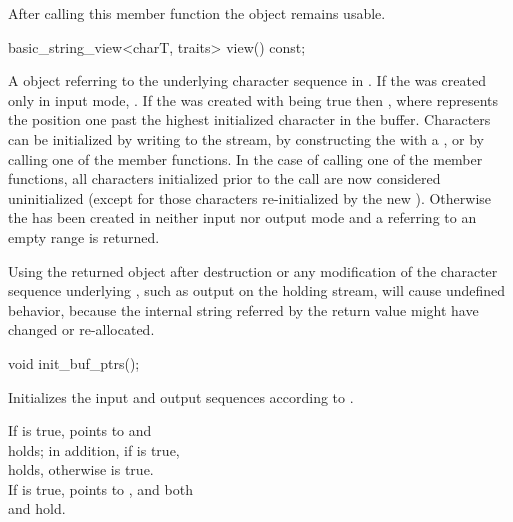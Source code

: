 \documentclass[ebook,11pt,article]{memoir}
\begin{document}
\begin{insrt}
\begin{itemdescr}
\pnum
\begin{note}
After calling this member function the  object remains usable.
\end{note}
\end{itemdescr}

\begin{itemdecl}
basic_string_view<charT, traits> view() const;
\end{itemdecl}
\begin{itemdescr}
\pnum
\returns A  object referring to the  underlying character sequence
in . 
If the  was created only in input mode,  
. 
If the  was created with  being true 
then , 
where  represents the position one past the highest initialized character in the buffer. 
Characters can be initialized by writing to the stream, 
by constructing the  with a , 
or by calling one of the  member functions. 
In the case of calling one of the  member functions, 
all characters initialized prior to the call are now considered uninitialized 
(except for those characters re-initialized by the new ). 
Otherwise the  has been created in neither input nor output mode 
and a  referring to an empty range is returned. 

\pnum
\begin{note}
Using the returned  object after destruction or any modification of the character sequence underlying , such as output on the holding stream, will cause undefined behavior, because the internal string referred by the return value might have changed or re-allocated. 
\end{note}
\end{itemdescr}


\begin{itemdecl}
void init_buf_ptrs();
\end{itemdecl}
\begin{itemdescr}
\pnum
\effects 
Initializes the input and output sequences according to .

\pnum
\ensures
If  is true, 
 points to  and \\ holds; 
in addition, if  is true, \\
 holds, 
otherwise  is true. \\
If  is true, 
 points to , 
and both \\ and  hold.


\end{itemdescr}
\end{insrt}
\end{document}
